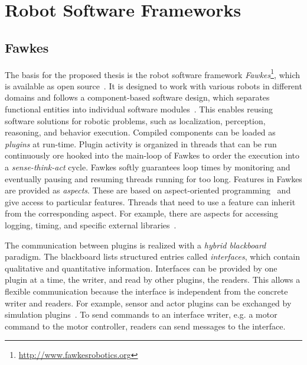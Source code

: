 \section{Robot Software Frameworks}
\label{sec:robot-software-frameworks}
\subsection{Fawkes}
\label{sec:fawkes}
The basis for the proposed thesis is the robot software framework
\emph{Fawkes}\footnote{\url{http://www.fawkesrobotics.org}}, which is
available as open source~\cite{FawkesDesign,Fawkes-RCLL-2014}.
It is designed to work with
various robots in different domains and follows a component-based
software design, which separates functional entities into individual
software modules~\cite{component}. This enables reusing
software solutions for robotic problems, such as localization,
perception, reasoning, and behavior execution. Compiled
components can be loaded as \emph{plugins} at run-time.
%
Plugin activity is organized in threads
that can be run continuously ore hooked into
the main-loop of Fawkes to order the execution into a
\emph{sense-think-act} cycle.
Fawkes softly guarantees loop times by
monitoring and eventually pausing and resuming threads running for too
long.
Features in Fawkes are provided as \emph{aspects}. These are
based on aspect-oriented programming~\cite{aspect_oriented} and give
access to particular features. Threads that need to use a feature can
inherit from the corresponding aspect. For example, there are aspects
for accessing logging, timing, and specific external libraries~\cite{tnthesis}.

The communication between plugins is realized with a \emph{hybrid blackboard}
paradigm. The blackboard lists structured entries called
\emph{interfaces}, which contain qualitative and quantitative information.
Interfaces can be
provided by one plugin at a time, the writer, and read by other
plugins, the readers. This allows a flexible communication
because the interface is independent from the concrete writer and readers.
For example, sensor and actor plugins can be exchanged by simulation
plugins~\cite{LLSF-Sim}.
To send commands to an interface writer, e.g. a
motor command to the motor controller, readers can send messages to
the interface.

